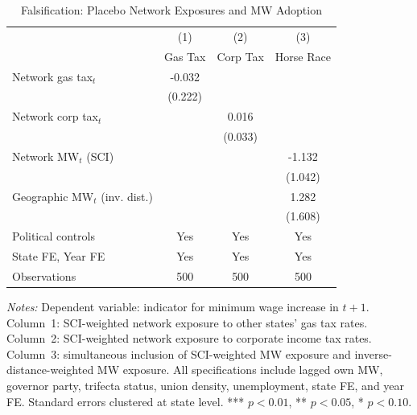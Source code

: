 \begin{table}[t]
\centering
\caption{Falsification: Placebo Network Exposures and MW Adoption}
\label{tab:diffusion_fals}
\begin{threeparttable}
\small
\begin{tabular}{lccc}
\toprule
 & (1) & (2) & (3) \\
 & Gas Tax & Corp Tax & Horse Race \\
\midrule
Network gas tax$_t$ & -0.032 & & \\
 & (0.222) & & \\
Network corp tax$_t$ & & 0.016 & \\
 & & (0.033) & \\
Network MW$_t$ (SCI) & & & -1.132 \\
 & & & (1.042) \\
Geographic MW$_t$ (inv. dist.) & & & 1.282 \\
 & & & (1.608) \\
\addlinespace
\midrule
Political controls & Yes & Yes & Yes \\
State FE, Year FE & Yes & Yes & Yes \\
Observations & 500 & 500 & 500 \\
\bottomrule
\end{tabular}
\begin{tablenotes}[flushleft]
\small
\item \textit{Notes:} Dependent variable: indicator for minimum wage increase in $t+1$. Column~1: SCI-weighted network exposure to other states' gas tax rates. Column~2: SCI-weighted network exposure to corporate income tax rates. Column~3: simultaneous inclusion of SCI-weighted MW exposure and inverse-distance-weighted MW exposure. All specifications include lagged own MW, governor party, trifecta status, union density, unemployment, state FE, and year FE. Standard errors clustered at state level. *** $p<0.01$, ** $p<0.05$, * $p<0.10$.
\end{tablenotes}
\end{threeparttable}
\end{table}
